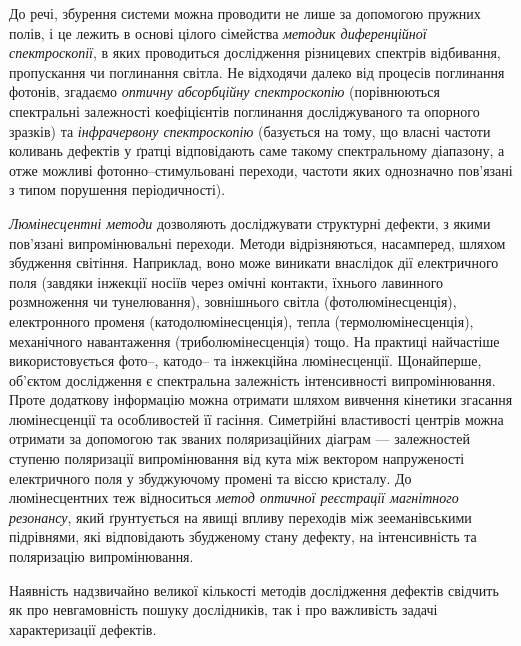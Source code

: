 До речі, збурення системи можна проводити не лише за допомогою пружних полів,
і це лежить в основі цілого сімейства \emph{методик диференційної спектроскопії},
в яких проводиться дослідження різницевих спектрів відбивання, пропускання чи поглинання світла.
Не відходячи далеко від процесів поглинання фотонів,
згадаємо \emph{оптичну абсорбційну спектроскопію}  (порівнюються спектральні залежності
коефіцієнтів поглинання досліджуваного та опорного  зразків)
та \emph{інфрачервону спектроскопію} (базується на тому, що власні частоти коливань 
дефектів у ґратці відповідають саме такому спектральному діапазону, 
а отже можливі фотонно--стимульовані переходи,
частоти яких однозначно пов'язані з типом порушення періодичності).

\emph{Люмінесцентні методи} дозволяють досліджувати структурні дефекти, 
з якими пов'язані випромінювальні переходи.
Методи відрізняються, насамперед, шляхом збудження світіння.
Наприклад, воно може виникати внаслідок дії електричного поля 
(завдяки інжекції носіїв через омічні контакти, їхнього лавинного розмноження чи тунелювання),
зовнішнього світла (фотолюмінесценція),
електронного променя (катодолюмінесценція),
тепла (термолюмінесценція),
механічного навантаження (триболюмінесценція) тощо.
На практиці найчастіше використовується фото--, катодо-- та інжекційна люмінесценції.
Щонайперше, об'єктом дослідження є спектральна залежність інтенсивності
випромінювання.
Проте додаткову інформацію можна отримати шляхом вивчення
 кінетики згасання люмінесценції та особливостей її гасіння.
Симетрійні властивості центрів можна отримати за допомогою так званих
поляризаційних діаграм --- залежностей ступеню
поляризації випромінювання від кута між вектором напруженості 
електричного поля у збуджуючому промені та віссю кристалу.
До люмінесцентних теж відноситься \emph{метод оптичної реєстрації магнітного резонансу},
який ґрунтується на явищі впливу переходів між зееманівськими підрівнями,
які відповідають збудженому стану дефекту, на інтенсивність та поляризацію випромінювання.


Наявність надзвичайно великої кількості методів дослідження дефектів свідчить 
як про невгамовність пошуку дослідників, так і про важливість задачі характеризації дефектів.